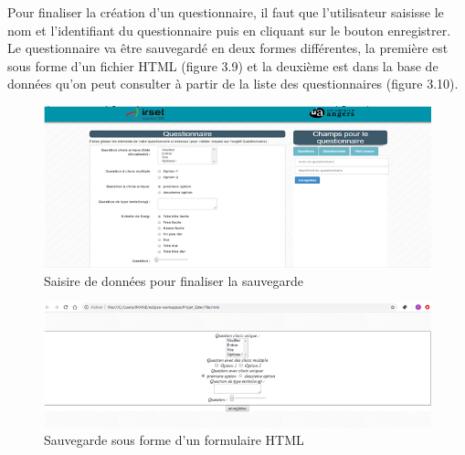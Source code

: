 Pour finaliser la création d’un questionnaire, il faut que l’utilisateur saisisse le nom et l’identifiant du questionnaire puis en cliquant sur le bouton enregistrer. Le questionnaire va être sauvegardé en deux formes différentes, la première est sous forme d’un fichier HTML (figure 3.9) et la deuxième est dans la base de données qu’on peut consulter à partir de la liste des questionnaires (figure 3.10).


\begin{figure}[H]
    \begin{center}
	\includegraphics[scale=0.7]{img/questionnaire/enregistrement}
    \end{center}
    \caption{Saisire de données pour finaliser la sauvegarde}
\end{figure}


\begin{figure}[H]
    \begin{center}
	\includegraphics[scale=0.7]{img/questionnaire/fichier}
    \end{center}
    \caption{Sauvegarde sous forme d'un formulaire HTML}
\end{figure}

